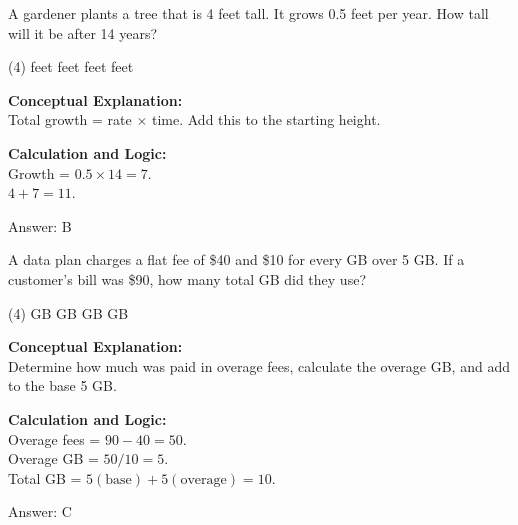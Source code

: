 \documentclass[11pt,paper=a4,answers]{exam}
\begin{document}
\begin{questions}
\vspace{20pt}

\question
A gardener plants a tree that is 4 feet tall. It grows 0.5 feet per year. How tall will it be after 14 years?
\begin{tasks}(4)
     feet
     feet
     feet
     feet
\end{tasks}

\begin{solution}
\textbf{Conceptual Explanation:} \\
Total growth = rate $\times$ time. Add this to the starting height.

\vspace{10pt}
\textbf{Calculation and Logic:} \\
Growth = $0.5 \times 14 = 7$. \\
$4 + 7 = 11$.

\vspace{15pt}
Answer: \colorbox{yellow!100}{B}
\end{solution}

\vspace{20pt}

\question
A data plan charges a flat fee of \$40 and \$10 for every GB over 5 GB. If a customer's bill was \$90, how many total GB did they use?
\begin{tasks}(4)
     GB
     GB
     GB
     GB
\end{tasks}

\begin{solution}
\textbf{Conceptual Explanation:} \\
Determine how much was paid in overage fees, calculate the overage GB, and add to the base 5 GB.

\vspace{10pt}
\textbf{Calculation and Logic:} \\
Overage fees = $90 - 40 = 50$. \\
Overage GB = $50 / 10 = 5$. \\
Total GB = $5 (\text{base}) + 5 (\text{overage}) = 10$.

\vspace{15pt}
Answer: \colorbox{yellow!100}{C}
\end{solution}

\vspace{20pt}


\end{questions}
\end{document}
